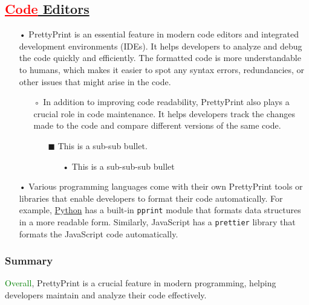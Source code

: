 \documentclass[12pt, a4paper]{scrreprt}
\begin{document}
\subsection{\textcolor{red}{\underline{Code}}\underline{ Editors}}
\begin{itemize}
\item[•] PrettyPrint is an essential feature in modern code editors and integrated development environments (IDEs). 
 It helps developers to analyze and debug the code quickly and efficiently. 
 The formatted code is more understandable to humans, which makes it easier to spot any syntax errors, redundancies, or other issues that might arise in the code.
\begin{itemize}
\item[◦] In addition to improving code readability, PrettyPrint also plays a crucial role in code maintenance. 
 It helps developers track the changes made to the code and compare different versions of the same code.
\begin{itemize}
\item[$\blacksquare$] This is a sub-sub bullet.
\begin{itemize}
\item[•] This is a sub-sub-sub bullet
\end{itemize}
\end{itemize}
\end{itemize}
\item[•] Various programming languages come with their own PrettyPrint tools or libraries that enable developers to format their code automatically. 
 For example, \href{http://python.org/}{Python} has a built-in \texttt{pprint} module that formats data structures in a more readable form. 
 Similarly, JavaScript has a \texttt{prettier} library that formats the JavaScript code automatically.
\end{itemize}
\subsubsection{Summary}
\textcolor{green}{Overall}, PrettyPrint is a crucial feature in modern programming, helping developers maintain and analyze their code effectively.
\end{document}
